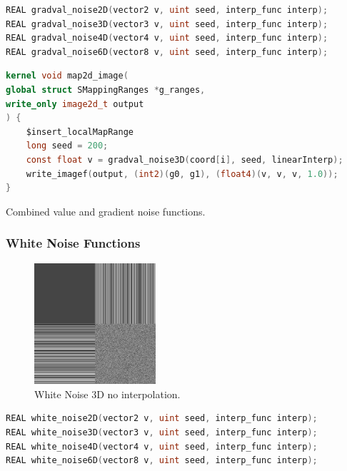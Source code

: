 \begin{lstlisting}[caption={Definition of gradval noise functions},label={lst:gradval_noise_definition},language=OpenCL]
REAL gradval_noise2D(vector2 v, uint seed, interp_func interp);
REAL gradval_noise3D(vector3 v, uint seed, interp_func interp);
REAL gradval_noise4D(vector4 v, uint seed, interp_func interp);
REAL gradval_noise6D(vector8 v, uint seed, interp_func interp);
\end{lstlisting}

\begin{lstlisting}[caption={Example for gradval noise functions},label={lst:gradval_noise_example},language=OpenCL]
kernel void map2d_image(
global struct SMappingRanges *g_ranges,
write_only image2d_t output
) {
    $insert_localMapRange
    long seed = 200;
    const float v = gradval_noise3D(coord[i], seed, linearInterp);
    write_imagef(output, (int2)(g0, g1), (float4)(v, v, v, 1.0));
}
\end{lstlisting}

Combined value and gradient noise functions.

\subsubsection{White Noise Functions}

\begin{figure}[h]
\centering
\includegraphics[width=0.4\textwidth]{out/noise_functions/white_noise3D_noInterp.png}
\caption{White Noise 3D no interpolation.}
\label{fig:white_noise3D_noInterp}
\end{figure}

\begin{lstlisting}[caption={Definition of white noise functions},label={lst:white_noise_definition},language=OpenCL]
REAL white_noise2D(vector2 v, uint seed, interp_func interp);
REAL white_noise3D(vector3 v, uint seed, interp_func interp);
REAL white_noise4D(vector4 v, uint seed, interp_func interp);
REAL white_noise6D(vector8 v, uint seed, interp_func interp);
\end{lstlisting}

